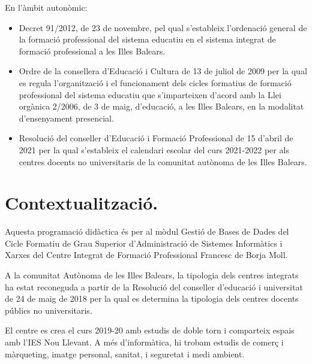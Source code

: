 \documentclass[catalan, a4paper, 12pt, titlepage]{article}
\begin{document}
En l'àmbit autonòmic:
\begin{itemize}
	\item Decret 91/2012, de 23 de novembre, pel qual s'estableix l'ordenació general de la formació professional del sistema educatiu en el sistema integrat de formació professional a les Illes Balears.
	\item Ordre de la consellera d'Educació i Cultura de 13 de juliol de 2009 per la qual es regula l'organització i el funcionament dels cicles formatius de formació professional del sistema educatiu que s'imparteixen d'acord amb la Llei orgànica 2/2006, de 3 de maig, d'educació, a les Illes Balears, en la modalitat d'ensenyament presencial.
	\item Resolució del conseller d’Educació i Formació Professional de 15 d’abril de 2021 per la qual s’estableix el calendari escolar del curs 2021-2022 per als centres docents no universitaris de la comunitat autònoma de les Illes Balears.
\end{itemize}


\section{Contextualització.}
\label{sec:contextualització}

Aquesta programació didàctica és per al mòdul Gestió de Bases de Dades del Cicle Formatiu de Grau Superior d'Administració de Sistemes Informàtics i Xarxes del Centre Integrat de Formació Professional Francesc de Borja Moll. 

A la comunitat Autònoma de les Illes Balears, la tipologia dels centres integrats ha estat reconeguda a partir de la Resolució del conseller d'educació i universitat de 24 de maig de 2018 per la qual es determina la tipologia dels centres docents públics no universitaris.

El centre es crea el curs 2019-20 amb estudis de doble torn i comparteix espais amb l'IES Nou Llevant. A més d'informàtica, hi trobam estudis de comerç i màrqueting, imatge personal, sanitat, i seguretat i medi ambient.
\end{document}

